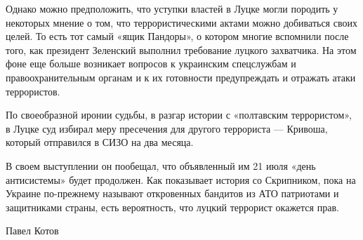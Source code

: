 Однако можно предположить, что уступки властей в Луцке могли породить у
некоторых мнение о том, что террористическими актами можно добиваться своих
целей. То есть тот самый «ящик Пандоры», о котором многие вспомнили после того,
как президент Зеленский выполнил требование луцкого захватчика. На этом фоне
еще больше возникает вопросов к украинским спецслужбам и правоохранительным
органам и к их готовности предупреждать и отражать атаки террористов. 

По своеобразной иронии судьбы, в разгар истории с «полтавским террористом», в
Луцке суд избирал меру пресечения для другого террориста — Кривоша, который
отправился в СИЗО на два месяца. 

В своем выступлении он пообещал, что объявленный им 21 июля «день антисистемы»
будет продолжен. Как показывает история со Скрипником, пока на Украине
по-прежнему называют откровенных бандитов из АТО патриотами и защитниками
страны, есть вероятность, что луцкий террорист окажется прав.

Павел Котов
  
